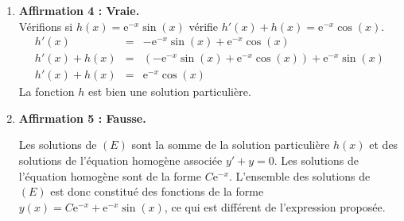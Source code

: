 \begin{enumerate}
\item \textbf{Affirmation 4 : Vraie.} \\
Vérifions si $h(x) = \mathrm{e}^{-x}\sin(x)$ vérifie $h'(x) + h(x) = \mathrm{e}^{-x} \cos(x)$.
\[
\begin{array}{rcl}
h'(x) &=& -\mathrm{e}^{-x}\sin(x) + \mathrm{e}^{-x}\cos(x) \\
h'(x) + h(x) &=& \left( -\mathrm{e}^{-x}\sin(x) + \mathrm{e}^{-x}\cos(x) \right) + \mathrm{e}^{-x}\sin(x) \\
h'(x) + h(x) &=& \mathrm{e}^{-x}\cos(x)
\end{array}
\]
La fonction $h$ est bien une solution particulière.

\item \textbf{Affirmation 5 : Fausse.} 

Les solutions de $(E)$ sont la somme de la solution particulière $h(x)$ et des solutions de l'équation homogène associée $y' + y = 0$.
Les solutions de l'équation homogène sont de la forme $C\mathrm{e}^{-x}$. 
L'ensemble des solutions de $(E)$ est donc constitué des fonctions de la forme $y(x) = C\mathrm{e}^{-x} + \mathrm{e}^{-x}\sin(x)$, ce qui est différent de l'expression proposée.
\end{enumerate}
\label{LastPage}
